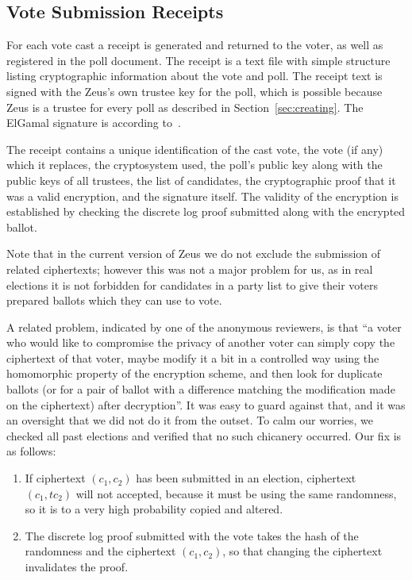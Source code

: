 \documentclass[jets]{usenixjournal}
\begin{document}
\subsection{Vote Submission Receipts}
\label{sec:receipts}

For each vote cast a receipt is generated and returned to the voter,
as well as registered in the poll document.
The receipt is a text file with simple structure listing cryptographic
information about the vote and poll.
The receipt text is signed with the Zeus's own trustee key for the
poll, which is possible because Zeus is a trustee for every poll
as described in Section~\ref{sec:creating}.
The ElGamal signature is according to~\cite{schneier:1995}.

The receipt contains a unique identification of the cast vote,
the vote (if any) which it replaces, the cryptosystem used,
the poll's public key along with the public keys of all trustees,
the list of candidates, the cryptographic proof that it was a valid
encryption, and the signature itself. The validity of the encryption
is established by checking the discrete log proof submitted along with
the encrypted ballot. 

Note that in the current version of Zeus we do not exclude the
submission of related ciphertexts; however this was not a major
problem for us, as in real elections it is not forbidden for
candidates in a party list to give their voters prepared ballots
which they can use to vote.

A related problem, indicated by one of the anonymous reviewers, is that
``a voter who would like to compromise the privacy of another voter can
simply copy the ciphertext of that voter, maybe modify it a bit in a
controlled way using the homomorphic property of the encryption
scheme, and then look for duplicate ballots (or for a pair of ballot
with a difference matching the modification made on the ciphertext)
after decryption''. It was easy to guard against that, and it was an
oversight that we did not do it from the outset. To calm our worries,
we checked all past elections and verified that no such chicanery
occurred. Our fix is as follows:

\begin{enumerate}
\item If ciphertext $(c_1, c_2)$ has been submitted in an election,
  ciphertext $(c_1, t  c_2)$ will not accepted, because it must be using
  the same randomness, so it is to a very high probability copied and
  altered.
\item The discrete log proof submitted with the vote takes the hash of
  the randomness and the ciphertext $(c_1, c_2)$, so that changing the
  ciphertext invalidates the proof.
\end{enumerate}
\end{document}
